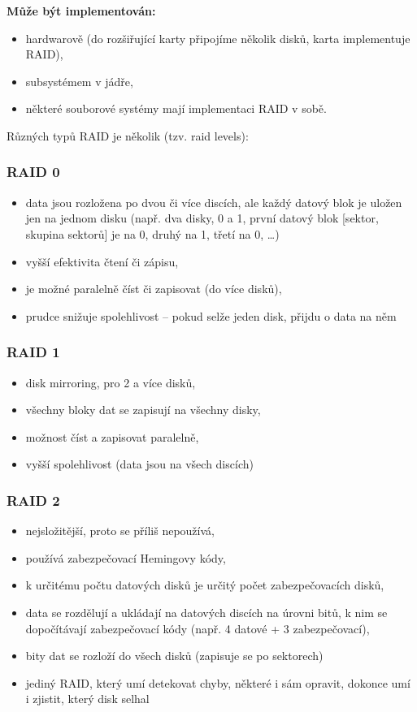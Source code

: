 \documentclass[a4paper, 11pt]{article}
\begin{document}
\textbf{Může být implementován:}
\begin{itemize}
    \item hardwarově (do rozšiřující karty připojíme několik disků, karta implementuje RAID),
    \item subsystémem v jádře,
    \item některé souborové systémy mají implementaci RAID v sobě.
\end{itemize}
 
Různých typů RAID je několik (tzv. raid levels):
 
\subsubsection{RAID 0}
\begin{itemize}
    \item data jsou rozložena po dvou či více discích, ale každý datový blok je uložen jen na jednom disku (např. dva disky, 0 a 1, první datový blok [sektor, skupina sektorů] je na 0, druhý na 1, třetí na 0, \ldots)
    \item vyšší efektivita čtení či zápisu,
    \item je možné paralelně číst či zapisovat (do více disků),
    \item prudce snižuje spolehlivost -- pokud selže jeden disk, přijdu o data na něm
\end{itemize}
 
\subsubsection{RAID 1}
\begin{itemize}
    \item disk mirroring, pro 2 a více disků,
    \item všechny bloky dat se zapisují na všechny disky,
    \item možnost číst a zapisovat paralelně,
    \item vyšší spolehlivost (data jsou na všech discích)
\end{itemize}
 
\subsubsection{RAID 2}
\begin{itemize}
    \item nejsložitější, proto se příliš nepoužívá,
    \item používá zabezpečovací Hemingovy kódy,
    \item k určitému počtu datových disků je určitý počet zabezpečovacích disků,
    \item data se rozdělují a ukládají na datových discích na úrovni bitů, k nim se dopočítávají zabezpečovací kódy (např. 4 datové + 3 zabezpečovací),
    \item bity dat se rozloží do všech disků (zapisuje se po sektorech)
    \item jediný RAID, který umí detekovat chyby, některé i sám opravit, dokonce umí i zjistit, který disk selhal
\end{itemize}
\end{document}
